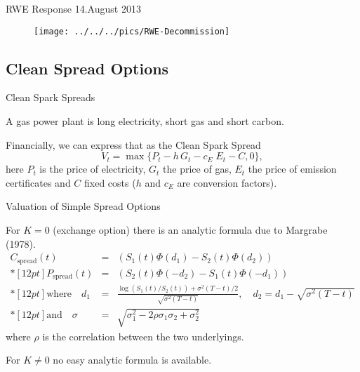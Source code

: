 {RWE Response 14.August 2013}
\begin{figure}[htp]
\centering
\texttt{[image: ../../../pics/RWE-Decommission]}
\end{figure}

\subsection{Clean Spread Options}

{Clean Spark Spreads}






	A gas power plant is  long electricity, short gas and short carbon.


	Financially, we can express that as the Clean Spark Spread
\begin{equation}
V_t = \max\{P_t - h\,G_t - c_E\;E_t - C, 0\},
\label{spark_spread_value}
\end{equation}
here  $P_t$ is the price of electricity, $G_t$ the price of gas, $E_t$ the price of emission certificates  and $C$ fixed costs ($h$ and $c_E$ are conversion factors).






{Valuation of Simple Spread Options}

For $K=0$ (exchange option) there is an analytic formula due to
Margrabe (1978).
$$\begin{array}{lll}
 C_{\mbox{spread}}(t) & = & (S_1(t)\Phi(d_1)-S_2(t)\Phi(d_2))
 \\*[12pt]
 P_{\mbox{spread}}(t) & = & (S_2(t)\Phi(-d_2)-S_1(t)\Phi(-d_1))
 \\*[12pt]
 \mbox{where}\quad d_1 & = & \frac{\log(S_1(t)/S_2(t))+\sigma^{2}(T-t)/2}{\sqrt{\sigma^{2}(T-t)}},\quad d_2=d_1-\sqrt{\sigma^{2}(T-t)}
 \\*[12pt]
 \mbox{and}\quad \sigma & = & \sqrt{\sigma_1^2-2\rho\sigma_1\sigma_2+\sigma_2^2}
\end{array}$$
where $\rho$ is the correlation between the two underlyings.

For $K\neq 0$ no easy analytic formula is available.

